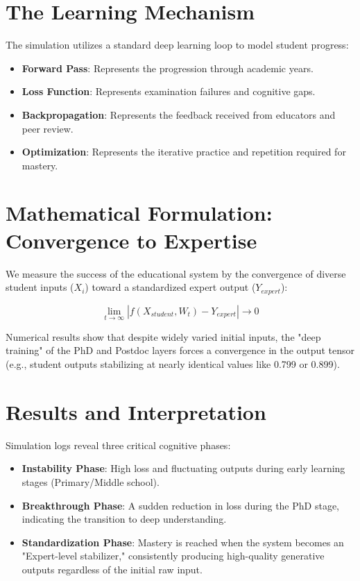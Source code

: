 \documentclass[12pt]{article}
\begin{document}
\section{The Learning Mechanism}

The simulation utilizes a standard deep learning loop to model student progress:
\begin{itemize}
\item \textbf{Forward Pass}: Represents the progression through academic years.
\item \textbf{Loss Function}: Represents examination failures and cognitive gaps.
\item \textbf{Backpropagation}: Represents the feedback received from educators and peer review.
\item \textbf{Optimization}: Represents the iterative practice and repetition required for mastery.
\end{itemize}

\section{Mathematical Formulation: Convergence to Expertise}

We measure the success of the educational system by the convergence of diverse student inputs ($X_i$) toward a standardized expert output ($Y_{expert}$):

\[
\lim_{t \to \infty} |f(X_{student}, W_t) - Y_{expert}| \rightarrow 0
\]

Numerical results show that despite widely varied initial inputs, the "deep training" of the PhD and Postdoc layers forces a convergence in the output tensor (e.g., student outputs stabilizing at nearly identical values like 0.799 or 0.899).

\section{Results and Interpretation}

Simulation logs reveal three critical cognitive phases:
\begin{itemize}
\item \textbf{Instability Phase}: High loss and fluctuating outputs during early learning stages (Primary/Middle school).
\item \textbf{Breakthrough Phase}: A sudden reduction in loss during the PhD stage, indicating the transition to deep understanding.
\item \textbf{Standardization Phase}: Mastery is reached when the system becomes an "Expert-level stabilizer," consistently producing high-quality generative outputs regardless of the initial raw input.
\end{itemize}
\end{document}
